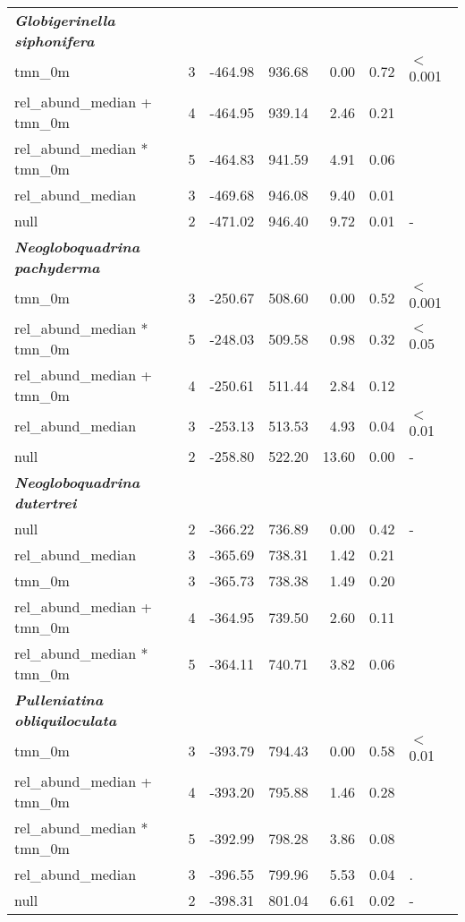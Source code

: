 \documentclass[a4paper]{article}
\begin{document}
\begin{table}
\begin{tabular}{lrrrrrl}
  \textbf{\textit{Globigerinella siphonifera}} &  &  &  &  &  &  \\ 
  tmn\_0m &   3 & -464.98 & 936.68 & 0.00 & 0.72 & $<$ 0.001 \\ 
  rel\_abund\_median + tmn\_0m &   4 & -464.95 & 939.14 & 2.46 & 0.21 &  \\ 
  rel\_abund\_median * tmn\_0m &   5 & -464.83 & 941.59 & 4.91 & 0.06 &  \\ 
  rel\_abund\_median &   3 & -469.68 & 946.08 & 9.40 & 0.01 &  \\ 
  null &   2 & -471.02 & 946.40 & 9.72 & 0.01 & - \\ 
   
  \textbf{\textit{Neogloboquadrina pachyderma}} &  &  &  &  &  &  \\ 
  tmn\_0m &   3 & -250.67 & 508.60 & 0.00 & 0.52 & $<$ 0.001 \\ 
  rel\_abund\_median * tmn\_0m &   5 & -248.03 & 509.58 & 0.98 & 0.32 & $<$ 0.05 \\ 
  rel\_abund\_median + tmn\_0m &   4 & -250.61 & 511.44 & 2.84 & 0.12 &  \\ 
  rel\_abund\_median &   3 & -253.13 & 513.53 & 4.93 & 0.04 & $<$ 0.01  \\ 
  null &   2 & -258.80 & 522.20 & 13.60 & 0.00 & - \\ 
  
  \textbf{\textit{Neogloboquadrina dutertrei}} &  &  &  &  &  &  \\ 
  null &   2 & -366.22 & 736.89 & 0.00 & 0.42 & - \\ 
  rel\_abund\_median &   3 & -365.69 & 738.31 & 1.42 & 0.21 &  \\ 
  tmn\_0m &   3 & -365.73 & 738.38 & 1.49 & 0.20 &  \\ 
  rel\_abund\_median + tmn\_0m &   4 & -364.95 & 739.50 & 2.60 & 0.11 &  \\ 
  rel\_abund\_median * tmn\_0m &   5 & -364.11 & 740.71 & 3.82 & 0.06 &  \\ 
  
  \textbf{\textit{Pulleniatina obliquiloculata}} &  &  &  &  &  &  \\ 
  tmn\_0m &   3 & -393.79 & 794.43 & 0.00 & 0.58 & $<$ 0.01 \\ 
  rel\_abund\_median + tmn\_0m &   4 & -393.20 & 795.88 & 1.46 & 0.28 &  \\ 
  rel\_abund\_median * tmn\_0m &   5 & -392.99 & 798.28 & 3.86 & 0.08 &  \\ 
  rel\_abund\_median &   3 & -396.55 & 799.96 & 5.53 & 0.04 & . \\ 
  null &   2 & -398.31 & 801.04 & 6.61 & 0.02 & - \\ 
  

\end{tabular}
\end{table}
\end{document}
